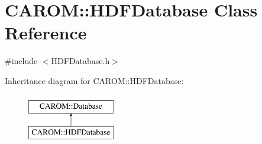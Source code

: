 \hypertarget{class_c_a_r_o_m_1_1_h_d_f_database}{\section{C\-A\-R\-O\-M\-:\-:H\-D\-F\-Database Class Reference}
\label{class_c_a_r_o_m_1_1_h_d_f_database}
}


{\ttfamily \#include $<$H\-D\-F\-Database.\-h$>$}

Inheritance diagram for C\-A\-R\-O\-M\-:\-:H\-D\-F\-Database\-:\begin{figure}[H]
\begin{center}
\leavevmode
\includegraphics[height=2.000000cm]{class_c_a_r_o_m_1_1_h_d_f_database}
\end{center}
\end{figure}
